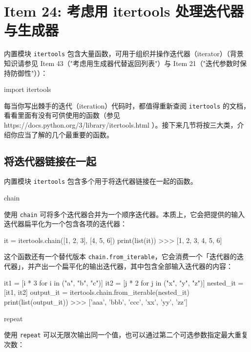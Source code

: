 \section{Item 24: 考虑用 itertools 处理迭代器与生成器}

内置模块 \texttt{itertools} 包含大量函数，可用于组织并操作迭代器（iterator）（背景知识请参见 Item 43（"考虑用生成器代替返回列表"）与 Item 21（"迭代参数时保持防御性"））：

\begin{codebox}[python]
import itertools
\end{codebox}

每当你写出棘手的迭代（iteration）代码时，都值得重新查阅 \texttt{itertools} 的文档，看看里面有没有可供使用的函数（参见 https://docs.python.org/3/library/itertools.html ）。接下来几节将按三大类，介绍你应当了解的几个最重要的函数。

\subsection{将迭代器链接在一起}

内置模块 \texttt{itertools} 包含多个用于将迭代器链接在一起的函数。

\begin{codebox}[python]
chain
\end{codebox}

使用 \texttt{chain} 可将多个迭代器合并为一个顺序迭代器。本质上，它会把提供的输入迭代器扁平化为一个包含各项的迭代器：

\begin{codebox}[python]
it = itertools.chain([1, 2, 3], [4, 5, 6])
print(list(it))
>>>
[1, 2, 3, 4, 5, 6]
\end{codebox}

这个函数还有一个替代版本 \texttt{chain.from\_iterable}，它会消费一个「迭代器的迭代器」，并产出一个扁平化的输出迭代器，其中包含全部输入迭代器的内容：

\begin{codebox}[python]
it1 = [i * 3 for i in ("a", "b", "c")]
it2 = [j * 2 for j in ("x", "y", "z")]
nested_it = [it1, it2]
output_it = itertools.chain.from_iterable(nested_it)
print(list(output_it))
>>>
['aaa', 'bbb', 'ccc', 'xx', 'yy', 'zz']
\end{codebox}

\begin{codebox}[python]
repeat
\end{codebox}

使用 \texttt{repeat} 可以无限次输出同一个值，也可以通过第二个可选参数指定最大重复次数：

